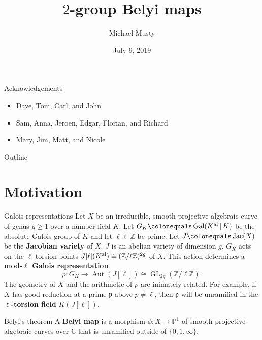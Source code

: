 \documentclass[xcolor=dvipsnames,handout]{beamer}
\title{$2$-group Belyi maps}
\author{Michael Musty}
\date{July 9, 2019}
\institute{Dartmouth College}
\theoremstyle{plain}
\newcommand{\PP}{\mathbb P}
\newcommand{\CC}{\mathbb C}
\newcommand{\ZZ}{\mathbb Z}
\newcommand{\Kal}{{{K}^{\textup{al}}}}
\DeclareMathOperator{\Aut}{Aut}
\DeclareMathOperator{\Gal}{Gal}
\DeclareMathOperator{\GL}{GL}
\DeclareMathOperator{\Jac}{Jac}
\begin{document}
  \maketitle
  \begin{frame}{Acknowledgements}
    \begin{itemize}
      \item
        Dave, Tom, Carl, and John
      \item
        Sam, Anna, Jeroen, Edgar, Florian, and Richard
      \item
        Mary, Jim, Matt, and Nicole
    \end{itemize}
  \end{frame}
  \begin{frame}{Outline}
    \tableofcontents
  \end{frame}
  \section{Motivation}{
    \begin{frame}{Galois representations}
      Let $X$ be an irreducible, smooth
      projective algebraic curve of genus $g\geq 1$
      over a number field $K$.
      Let $G_K\colonequals\Gal(\Kal\,|\,K)$ be
      the absolute Galois group of $K$ and
      let $\ell\in\ZZ$ be prime.
      \pause\newline
      Let $J\colonequals\Jac(X)$ be the
      \textbf{Jacobian variety} of $X$.
      $J$ is an abelian variety of dimension $g$.
      \pause\newline
      $G_K$ acts on the $\ell$-torsion points
      $J[\ell](\Kal)\cong(\ZZ/\ell\ZZ)^{2g}$ of $X$.
      \pause\newline
      This action determines a
      \textbf{mod-$\ell$ Galois representation}
      \[
        \rho\colon G_K\to\Aut(J[\ell])\cong\GL_{2g}(\ZZ/\ell\ZZ).
      \]
      \pause
      The geometry of $X$ and the arithmetic of
      $\rho$ are inimately related.
      \pause
      For example,
      if $X$ has good reduction at a prime
      $\mathfrak{p}$ above
      $p\neq\ell$,
      then $\mathfrak{p}$
      will be unramified in the
      \textbf{$\ell$-torsion field}
      $K(J[\ell])$.
    \end{frame}
    \begin{frame}{Belyi's theorem}
      A \textbf{Belyi map}
      is a morphism
      $\phi\colon X\to\PP^1$
      of smooth projective algebraic curves
      over $\CC$
      that is unramified outside of
      $\{0,1,\infty\}$.
      \pause

\end{frame}}
\end{document}
